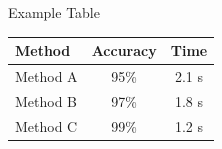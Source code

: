 
\begin{frame}{Example Table}
	
	\centering
	
	\begin{tabular}{lcc}
		\toprule
		Method & Accuracy & Time \\
		\midrule
		Method A & 95\% & 2.1 s \\
		Method B & 97\% & 1.8 s \\
		Method C & 99\% & 1.2 s \\
		\bottomrule
	\end{tabular}
	
\end{frame}